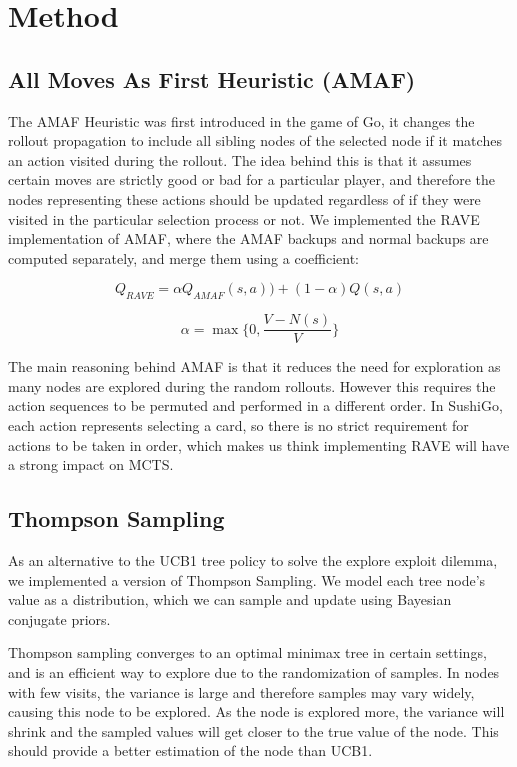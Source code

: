 \documentclass[conference]{IEEEtran}
\begin{document}
\section*{Method}
\subsection{All Moves As First Heuristic (AMAF)}
The AMAF Heuristic was first introduced in the game of Go\cite{b4}, it changes the rollout propagation to include all sibling nodes of the selected node if it matches an action visited during the rollout\cite{b5}. The idea behind this is that it assumes certain moves are strictly good or bad for a particular player\cite{b6}, and therefore the nodes representing these actions should be updated regardless of if they were visited in the particular selection process or not.
We implemented the RAVE implementation of AMAF\cite{b5}, where the AMAF backups and normal backups are computed separately, and merge them using a coefficient: 

\begin{equation}
Q_{RAVE}=\alpha Q_{AMAF}(s, a)) + (1 - \alpha) Q(s, a)
\end{equation}

\begin{equation}
\alpha = \max \{0, \frac{V - N(s)}{V}\}
\end{equation}

The main reasoning behind AMAF is that it reduces the need for exploration as many nodes are explored during the random rollouts\cite{b6}. However this requires the action sequences to be permuted and performed in a different order\cite{b4}. In SushiGo, each action represents selecting a card, so there is no strict requirement for actions to be taken in order, which makes us think implementing RAVE will have a strong impact on MCTS.

\subsection{Thompson Sampling}
As an alternative to the UCB1 tree policy to solve the explore exploit dilemma, we implemented a version of Thompson Sampling. We model each tree node’s value as a distribution, which we can sample and update using Bayesian conjugate priors.

Thompson sampling converges to an optimal minimax tree in certain settings\cite{b7}, and is an efficient way to explore due to the randomization of samples\cite{b7}. In nodes with few visits, the variance is large and therefore samples may vary widely, causing this node to be explored. As the node is explored more, the variance will shrink and the sampled values will get closer to the true value of the node. This should provide a better estimation of the node than UCB1.
\end{document}
